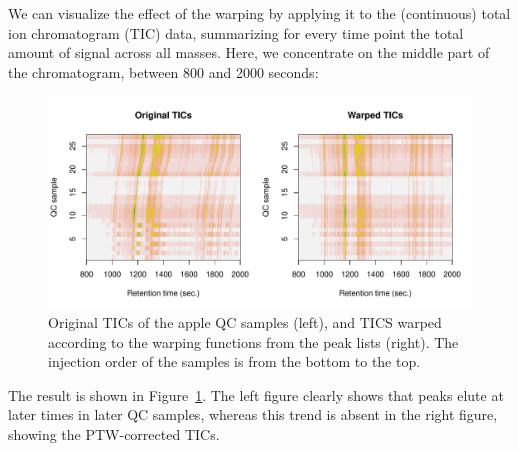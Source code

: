 \documentclass[a4paper,11pt]{article}
\begin{document}
We can visualize the effect of the warping by applying it to the
(continuous) total ion chromatogram (TIC) data, summarizing for
every time point the total amount of signal across all masses. Here,
we concentrate on the middle part of the chromatogram, between 800 and
2000 seconds:
\begin{Schunk}
\end{Schunk}
\begin{figure}[tb]
  \centering
\includegraphics{stickPTW-019}
\caption{Original TICs of the apple QC samples (left), and TICS warped
  according to the warping functions from the peak lists
  (right). The injection order of the samples is from the bottom to
  the top.}
\label{fig:warpedQCTICs}
\end{figure}
The result is shown in Figure~\ref{fig:warpedQCTICs}. The left figure
clearly shows that peaks elute at later times in later QC samples,
whereas this trend is absent in the right figure, showing the
PTW-corrected TICs.
\end{document}
